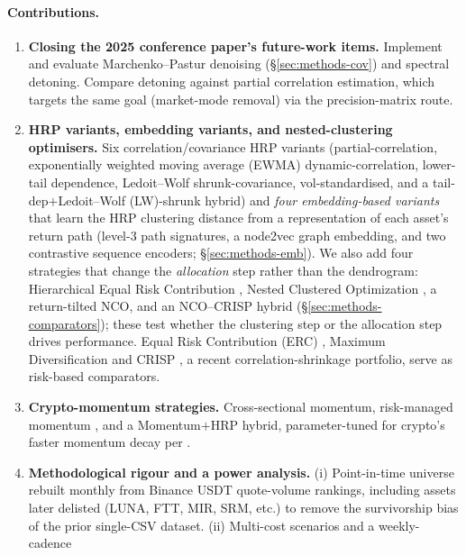 \documentclass[11pt,a4paper]{article}
\begin{document}
\paragraph{Contributions.}
\begin{enumerate}
\item \textbf{Closing the 2025 conference paper's future-work items.}
      Implement and evaluate Marchenko--Pastur denoising (\S\ref{sec:methods-cov})
      and spectral detoning. Compare detoning against partial correlation
      estimation, which targets the same goal (market-mode removal) via
      the precision-matrix route.
\item \textbf{HRP variants, embedding variants, and nested-clustering
      optimisers.} Six correlation/covariance HRP variants
      (partial-correlation, exponentially weighted moving average (EWMA)
      dynamic-correlation, lower-tail dependence,
      Ledoit--Wolf shrunk-covariance, vol-standardised, and a
      tail-dep$+$Ledoit--Wolf (LW)-shrunk hybrid) and \emph{four embedding-based
      variants} that learn the HRP clustering distance from a representation
      of each asset's return path (level-3 path signatures, a node2vec graph
      embedding, and two contrastive sequence encoders; \S\ref{sec:methods-emb}).
      We also add four strategies that change the \emph{allocation} step
      rather than the dendrogram: Hierarchical Equal Risk Contribution
      \citep{raffinot2018herc}, Nested Clustered Optimization
      \citep{lopezdeprado2019nco}, a return-tilted NCO, and an NCO--CRISP
      hybrid (\S\ref{sec:methods-comparators}); these test whether the
      clustering step or the allocation step drives performance. Equal Risk
      Contribution (ERC)
      \citep{maillard2010erc}, Maximum Diversification
      \citep{choueifaty2008maxdiv} and CRISP \citep{wuebben2026crisp},
      a recent correlation-shrinkage portfolio, serve as risk-based
      comparators.
\item \textbf{Crypto-momentum strategies.} Cross-sectional momentum,
      risk-managed momentum \citep{barroso2015momentum}, and a
      Momentum$+$HRP hybrid, parameter-tuned for crypto's faster
      momentum decay per \citep{liu2022cryptofactors}.
\item \textbf{Methodological rigour and a power analysis.}
      (i) Point-in-time universe rebuilt monthly from Binance USDT
      quote-volume rankings, including assets later delisted (LUNA, FTT,
      MIR, SRM, etc.) to remove the survivorship bias of the prior
      single-CSV dataset. (ii) Multi-cost scenarios and a weekly-cadence

\end{enumerate}
\end{document}
